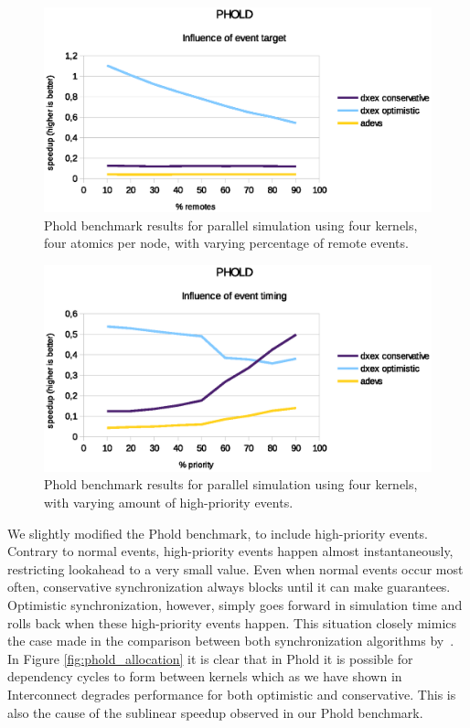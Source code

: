 \begin{figure}
    \center
    \includegraphics[width=\plotfraction\columnwidth]{fig/phold_remotes.eps}
    \caption{Phold benchmark results for parallel simulation using four kernels, four atomics per node, with varying percentage of remote events.}
\end{figure}
\begin{figure}
	\center
	\includegraphics[width=\plotfraction\columnwidth]{fig/phold_priority.eps}
	\caption{Phold benchmark results for parallel simulation using four kernels, with varying amount of high-priority events.}
	\label{fig:phold_priority}
\end{figure}

We slightly modified the Phold benchmark, to include high-priority events.
Contrary to normal events, high-priority events happen almost instantaneously, restricting lookahead to a very small value.
Even when normal events occur most often, conservative synchronization always blocks until it can make guarantees.
Optimistic synchronization, however, simply goes forward in simulation time and rolls back when these high-priority events happen.
This situation closely mimics the case made in the comparison between both synchronization algorithms by~\cite{FujimotoBook}.
In Figure \ref{fig:phold_allocation} it is clear that in Phold it is possible for dependency cycles to form between kernels which as we have shown in Interconnect degrades performance for both optimistic and conservative. This is also the cause of the sublinear speedup observed in our Phold benchmark.

